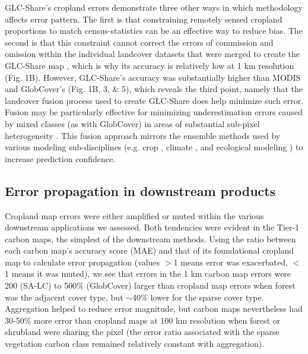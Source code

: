 \documentclass[12 pt, titlepage, a4paper]{article}
\begin{document}
GLC-Share's cropland errors demonstrate three other ways in which methodology affects error pattern. The first is that constraining remotely sensed cropland proportions to match census-statistics \citep{fritz_mapping_2015,fritz_highlighting_2011} can be an effective way to reduce bias. The second is that this constraint cannot correct the errors of commission and omission within the individual landcover datasets that were merged to create the GLC-Share map \citep{fritz_mapping_2015}, which is why its accuracy is relatively low at 1 km resolution (Fig. 1B). However, GLC-Share's accuracy was substantially higher than MODIS and GlobCover's (Fig. 1B, 3, \& 5), which reveals the third point, namely that the landcover fusion process used to create GLC-Share does help minimize such error.  Fusion may be particularly effective for minimizing underestimation errors caused by mixed classes (as with GlobCover) in areas of substantial sub-pixel heterogeneity \citep{fritz_mapping_2015,tuanmu_global_2014}.  This fusion approach mirrors the ensemble methods used by various modeling sub-disciplines (e.g. crop \citep{asseng_uncertainty_2013}, climate \citep{giorgi_calculation_2002}, and ecological modeling \citep{araujo_ensemble_2007}) to increase prediction confidence.

\vspace{-0.3 cm}
\subsection*{Error propagation in downstream products}
\vspace{-0.2 cm}
Cropland map errors were either amplified or muted within the various downstream applications we assessed. Both tendencies were evident in the Tier-1 carbon maps, the simplest of the downstream methods. Using the ratio between each carbon map's accuracy score (MAE) and that of its foundational cropland map to calculate error propagation (values $>$1 means error was exacerbated, $<$1 means it was muted), we see that errors in the 1 km carbon map errors were 200 (SA-LC) to 500\% (GlobCover) larger than cropland map errors when forest was the adjacent cover type, but $\sim$40\% lower for the sparse cover type.  Aggregation helped to reduce error magnitude, but carbon maps nevertheless had 30-50\% more error than cropland maps at 100 km resolution when forest or shrubland were sharing the pixel (the error ratio associated with the sparse vegetation carbon class remained relatively constant with aggregation).  
\end{document}
